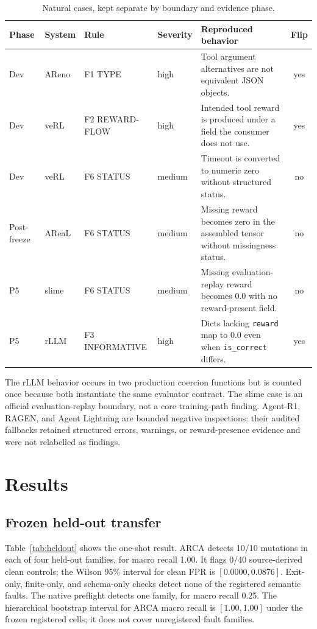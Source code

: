 \documentclass[10pt]{article}
\newcommand{\arca}{\textsc{ARCA}}
\newcommand{\code}[1]{\texttt{#1}}
\begin{document}
\begin{table}[t]
\centering
\small
\caption{Natural cases, kept separate by boundary and evidence phase.}
\label{tab:natural}
\begin{tabularx}{\textwidth}{@{}llllXc@{}}
\toprule
Phase & System & Rule & Severity & Reproduced behavior & Flip \\
\midrule
Dev & AReno & F1 TYPE & high & Tool argument alternatives are not equivalent JSON objects. & yes \\
Dev & veRL & F2 REWARD-FLOW & high & Intended tool reward is produced under a field the consumer does not use. & yes \\
Dev & veRL & F6 STATUS & medium & Timeout is converted to numeric zero without structured status. & no \\
Post-freeze & AReaL & F6 STATUS & medium & Missing reward becomes zero in the assembled tensor without missingness status. & no \\
P5 & slime & F6 STATUS & medium & Missing evaluation-replay reward becomes 0.0 with no reward-present field. & no \\
P5 & rLLM & F3 INFORMATIVE & high & Dicts lacking \code{reward} map to 0.0 even when \code{is\_correct} differs. & yes \\
\bottomrule
\end{tabularx}
\end{table}

The rLLM behavior occurs in two production coercion functions but is counted
once because both instantiate the same evaluator contract.  The slime case is
an official evaluation-replay boundary, not a core training-path finding.
Agent-R1, RAGEN, and Agent Lightning are bounded negative inspections: their
audited fallbacks retained structured errors, warnings, or reward-presence
evidence and were not relabelled as findings.

\section{Results}

\subsection{Frozen held-out transfer}

Table~\ref{tab:heldout} shows the one-shot result.  \arca{} detects 10/10
mutations in each of four held-out families, for macro recall 1.00.  It flags
0/40 source-derived clean controls; the Wilson 95\% interval for clean FPR is
$[0.0000,0.0876]$.  Exit-only, finite-only, and schema-only checks detect none
of the registered semantic faults.  The native preflight detects one family,
for macro recall 0.25.  The hierarchical bootstrap interval for \arca{} macro
recall is $[1.00,1.00]$ under the frozen registered cells; it does not cover
unregistered fault families.
\end{document}
